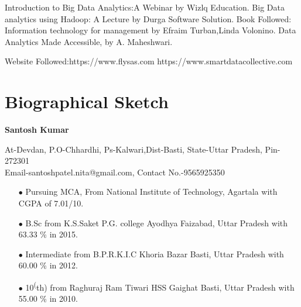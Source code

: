 \documentclass[english,a4paper,babel,12pt]{nitathesis}
\begin{document}
\flushbottom

\flushbottom

\flushbottom

\flushbottom






\begin{thebibliography}{8}

Introduction to Big Data Analytics:A Webinar by Wizlq Education. 
Big Data analytics using Hadoop: A Lecture by Durga Software Solution.
Book Followed:\newline
Information technology for management by Efraim Turban,Linda Volonino.\newline
Data Analytics Made Accessible, by A. Maheshwari.

Website Followed:https://www.flysas.com
https://www.smartdatacollective.com


\end{thebibliography}


\appendix
\chapter{Biographical Sketch}
\begin{center}
\textbf{\large Santosh Kumar}\par
At-Devdan, P.O-Chhardhi, Ps-Kalwari,Dist-Basti, State-Uttar Pradesh, Pin-272301\\
 Email-santoshpatel.nita@gmail.com, Contact No.-9565925350 
\end{center}
\begin{enumerate}
  \item[$\bullet$] Pursuing MCA, From National Institute of Technology, Agartala with CGPA of 7.01/10.
	\item[$\bullet$]B.Sc from K.S.Saket P.G. college Ayodhya Faizabad, Uttar Pradesh with 63.33 \% in 2015.
	\item[$\bullet$]Intermediate from B.P.R.K.I.C Khoria Bazar Basti, Uttar Pradesh with 60.00 \% in 2012.
	\item[$\bullet$]10\textsuperscript(th) from Raghuraj Ram Tiwari HSS Gaighat Basti, Uttar Pradesh with 55.00 \% in 2010.
\end{enumerate}
\end{document}
